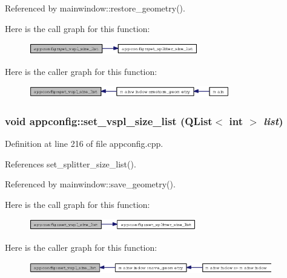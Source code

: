 Referenced by mainwindow::restore\_\-geometry().

Here is the call graph for this function:\begin{figure}[H]
\begin{center}
\leavevmode
\includegraphics[width=209pt]{classappconfig_578b013308a692c38f1c99530b8dbdd1_cgraph}
\end{center}
\end{figure}


Here is the caller graph for this function:\begin{figure}[H]
\begin{center}
\leavevmode
\includegraphics[width=248pt]{classappconfig_578b013308a692c38f1c99530b8dbdd1_icgraph}
\end{center}
\end{figure}
\subsubsection{\setlength{\rightskip}{0pt plus 5cm}void appconfig::set\_\-vspl\_\-size\_\-list (QList$<$ int $>$ {\em list})}\label{classappconfig_648e45ffc122e3e4fb1bfc998b82e250}




Definition at line 216 of file appconfig.cpp.

References set\_\-splitter\_\-size\_\-list().

Referenced by mainwindow::save\_\-geometry().

Here is the call graph for this function:\begin{figure}[H]
\begin{center}
\leavevmode
\includegraphics[width=207pt]{classappconfig_648e45ffc122e3e4fb1bfc998b82e250_cgraph}
\end{center}
\end{figure}


Here is the caller graph for this function:\begin{figure}[H]
\begin{center}
\leavevmode
\includegraphics[width=300pt]{classappconfig_648e45ffc122e3e4fb1bfc998b82e250_icgraph}
\end{center}
\end{figure}
